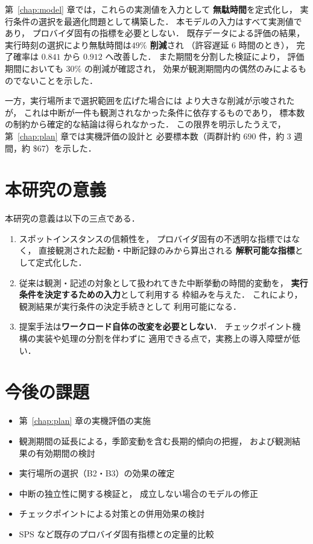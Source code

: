 \documentclass[11pt,a4paper]{ltjsreport}
\begin{document}
第~\ref{chap:model} 章では，これらの実測値を入力として
\textbf{無駄時間}を定式化し，
実行条件の選択を最適化問題として構築した．
本モデルの入力はすべて実測値であり，
プロバイダ固有の指標を必要としない．
既存データによる評価の結果，
実行時刻の選択により無駄時間は\textbf{$49\%$ 削減}され
（許容遅延 6 時間のとき），
完了確率は $0.841$ から $0.912$ へ改善した．
また期間を分割した検証により，
評価期間においても $30\%$ の削減が確認され，
効果が観測期間内の偶然のみによるものでないことを示した．

一方，実行場所まで選択範囲を広げた場合には
より大きな削減が示唆されたが，
これは中断が一件も観測されなかった条件に依存するものであり，
標本数の制約から確定的な結論は得られなかった．
この限界を明示したうえで，
第~\ref{chap:plan} 章では実機評価の設計と
必要標本数（両群計約 $690$ 件，約 3 週間，約 \$67）を示した．

\section{本研究の意義}

本研究の意義は以下の三点である．

\begin{enumerate}
  \item スポットインスタンスの信頼性を，
        プロバイダ固有の不透明な指標ではなく，
        直接観測された起動・中断記録のみから算出される
        \textbf{解釈可能な指標}として定式化した．
  \item 従来は観測・記述の対象として扱われてきた中断挙動の時間的変動を，
        \textbf{実行条件を決定するための入力}として利用する
        枠組みを与えた．
        これにより，観測結果が実行条件の決定手続きとして
        利用可能になる．
  \item 提案手法は\textbf{ワークロード自体の改変を必要としない}．
        チェックポイント機構の実装や処理の分割を伴わずに
        適用できる点で，実務上の導入障壁が低い．
\end{enumerate}

\section{今後の課題}

\begin{itemize}
  \item 第~\ref{chap:plan} 章の実機評価の実施
  \item 観測期間の延長による，季節変動を含む長期的傾向の把握，
        および観測結果の有効期間の検討
  \item 実行場所の選択（B2・B3）の効果の確定
  \item 中断の独立性に関する検証と，
        成立しない場合のモデルの修正
  \item チェックポイントによる対策との併用効果の検討
  \item SPS など既存のプロバイダ固有指標との定量的比較
\end{itemize}
\end{document}
